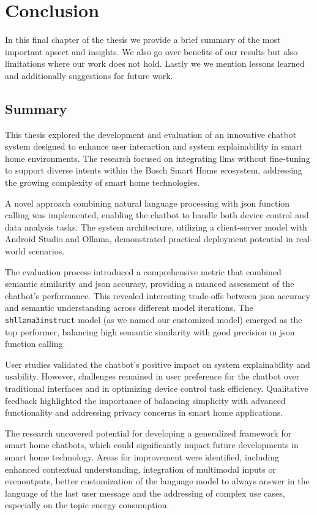 
\chapter{Conclusion}\label{chap:conclusion}
In this final chapter of the thesis we provide a brief summary of the most important apsect and insights. We also go over benefits of our results but also limitations where our work does not hold. 
Lastly we we mention lessons learned and additionally suggestions for future work.

\section{Summary}
This thesis explored the development and evaluation of an innovative chatbot system designed to enhance user interaction and system explainability in smart home environments. The research focused on integrating \glspl{llm} without fine-tuning to support diverse intents within the Bosch Smart Home ecosystem, addressing the growing complexity of smart home technologies.

A novel approach combining natural language processing with \gls{json} function calling was implemented, enabling the chatbot to handle both device control and data analysis tasks. The system architecture, utilizing a client-server model with Android Studio and Ollama, demonstrated practical deployment potential in real-world scenarios.

The evaluation process introduced a comprehensive metric that combined semantic similarity and \gls{json} accuracy, providing a nuanced assessment of the chatbot's performance. This revealed interesting trade-offs between \gls{json} accuracy and semantic understanding across different model iterations. 
The \texttt{shllama3instruct} model (as we named our customized model) emerged as the top performer, balancing high semantic similarity with good precision in \gls{json} function calling.

User studies validated the chatbot's positive impact on system explainability and usability. However, challenges remained in user preference for the chatbot over traditional interfaces and in optimizing device control task efficiency. Qualitative feedback highlighted the importance of balancing simplicity with advanced functionality and addressing privacy concerns in smart home applications.

The research uncovered potential for developing a generalized framework for smart home chatbots, which could significantly impact future developments in smart home technology. Areas for improvement were identified, including enhanced contextual understanding, integration of multimodal inputs or evenoutputs, better customization of the language model to always answer in the language of the last user message and the addressing of complex use cases, especially on the topic energy consumption.

